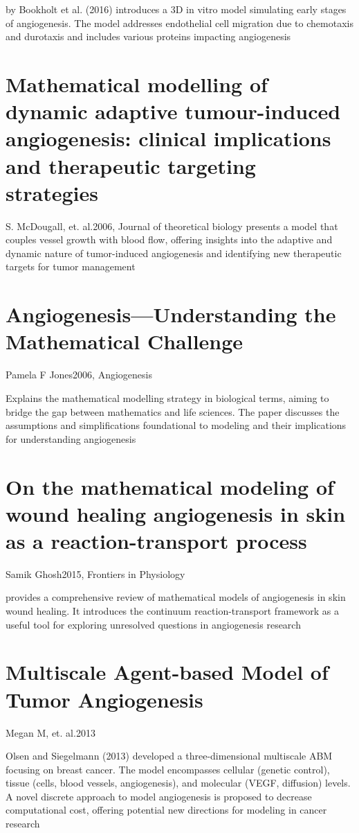 by Bookholt et al. (2016) introduces a 3D in vitro model simulating early stages of angiogenesis. The model addresses endothelial cell migration due to chemotaxis and durotaxis and includes various proteins impacting angiogenesis \cite{Bookholt2016}

\section{Mathematical modelling of dynamic adaptive tumour-induced angiogenesis: clinical implications and therapeutic targeting strategies}{S. McDougall, et. al.}{2006, Journal of theoretical biology}
presents a model that couples vessel growth with blood flow, offering insights into the adaptive and dynamic nature of tumor-induced angiogenesis and identifying new therapeutic targets for tumor management \cite{McDougall2006}

\section{Angiogenesis—Understanding the Mathematical Challenge}{Pamela F Jones}{2006, Angiogenesis}

Explains the mathematical modelling strategy in biological terms, aiming to bridge the gap between mathematics and life sciences. The paper discusses the assumptions and simplifications foundational to modeling and their implications for understanding angiogenesis \cite{Jones2006}

\section{On the mathematical modeling of wound healing angiogenesis in skin as a reaction-transport process}{Samik Ghosh}{2015, Frontiers in Physiology}

provides a comprehensive review of mathematical models of angiogenesis in skin wound healing. It introduces the continuum reaction-transport framework as a useful tool for exploring unresolved questions in angiogenesis research \cite{Ghosh2015} 

\section{Multiscale Agent-based Model of Tumor Angiogenesis}{Megan M, et. al.}{2013}

Olsen and Siegelmann (2013) developed a three-dimensional multiscale ABM focusing on breast cancer. The model encompasses cellular (genetic control), tissue (cells, blood vessels, angiogenesis), and molecular (VEGF, diffusion) levels. A novel discrete approach to model angiogenesis is proposed to decrease computational cost, offering potential new directions for modeling in cancer research \cite{Olsen2013}

